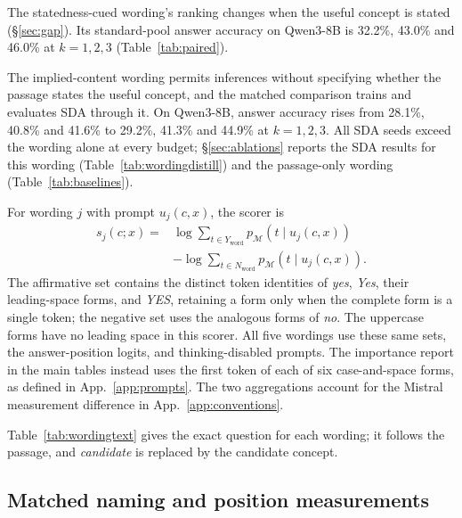 The statedness-cued wording's ranking changes when the useful concept
is stated (\S\ref{sec:gap}). Its standard-pool answer accuracy on
Qwen3-8B is 32.2\%, 43.0\% and 46.0\% at $k=1,2,3$
(Table~\ref{tab:paired}).

The implied-content wording permits inferences without specifying
whether the passage states the useful concept, and the matched
comparison trains and evaluates SDA through it. On Qwen3-8B, answer
accuracy rises from 28.1\%, 40.8\% and 41.6\% to 29.2\%, 41.3\% and
44.9\% at $k=1,2,3$. All SDA seeds exceed the wording alone at every
budget; \S\ref{sec:ablations} reports the SDA results for this wording
(Table~\ref{tab:wordingdistill}) and the passage-only wording
(Table~\ref{tab:baselines}).





For wording $j$ with prompt $u_j(c,x)$, the scorer is
\begin{equation}
\begin{split}
s_j(c;x)={}&\log\!\sum_{t\in Y_{\mathrm{word}}}p_{\mathcal M}(t\mid u_j(c,x))\\
&-\log\!\sum_{t\in N_{\mathrm{word}}}p_{\mathcal M}(t\mid u_j(c,x)).
\end{split}
\label{eq:wordingscore}
\end{equation}
The affirmative set contains the distinct token identities of
\emph{yes}, \emph{Yes}, their leading-space forms, and \emph{YES},
retaining a form only when the complete form is a single token; the
negative set uses the analogous forms of \emph{no}. The uppercase
forms have no leading space in this scorer. All five wordings use
these same sets, the answer-position logits, and thinking-disabled
prompts. The importance report in the main tables instead uses the
first token of each of six case-and-space forms, as defined in
App.~\ref{app:prompts}. The two aggregations account for the Mistral
measurement difference in App.~\ref{app:conventions}.

Table~\ref{tab:wordingtext} gives the exact question for each wording;
it follows the passage, and \emph{candidate} is replaced by the
candidate concept.



\subsection{Matched naming and position measurements}
\label{app:naming}

